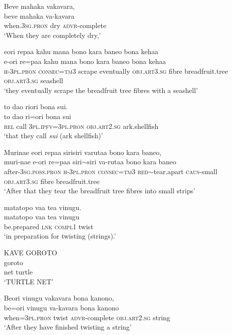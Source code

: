 \ea\label{ex:text4-19}
Beve mahaka vakavara,\\
\gll beve	mahaka	va-kavara\\
     when.3\textsc{sg}.\textsc{pron}	dry	\textsc{advr}-complete\\
\glt `When they are completely dry,'
\z

\newpage
\ea\label{ex:text4-20}
eori repaa kahu mana bono kara baneo bona kehaa\\
\gll e-ori	re=paa	kahu	mana	bono	kara	baneo	bona	kehaa\\
     \textsc{h}-3\textsc{pl}.\textsc{pron}	\textsc{consec}=\textsc{tm}3	scrape	eventually	\textsc{obj}.\textsc{art}3.\textsc{sg}	fibre	breadfruit.tree	\textsc{obj}.\textsc{art}3.\textsc{sg}	seashell\\
\glt `they eventually scrape the breadfruit tree fibres with a seashell'
\z

\ea\label{ex:text4-21}
to dao riori bona sui.\\
\gll to	dao	ri=ori	bona	sui\\
     \textsc{rel}	call	3\textsc{pl}.\textsc{ipfv}=3\textsc{pl}.\textsc{pron}	\textsc{obj}.\textsc{art}2.\textsc{sg}	ark.shellfish\\
\glt `that they call \textit{sui} (ark shellfish)'
\z

\ea\label{ex:text4-22}
Murinae eori repaa sirisiri varutaa bono kara baneo,\\
\gll muri-nae	e-ori	re=paa	siri{$\sim$}siri	va-rutaa	bono	kara	baneo\\
     after-3\textsc{sg}.\textsc{poss}.\textsc{pron}	\textsc{h}-3\textsc{pl}.\textsc{pron}	\textsc{consec}=\textsc{tm}3	\textsc{red}{$\sim$}tear.apart	\textsc{caus}-small	\textsc{obj}.\textsc{art}3.\textsc{sg}	fibre	breadfruit.tree\\
\glt `After that they tear the breadfruit tree fibres into small strips'
\z

\ea\label{ex:text4-23}
matatopo vaa tea vinugu.\\
\gll matatopo	vaa	tea	vinugu\\
     be.prepared	\textsc{lnk}	\textsc{compl}1	twist\\
\glt `in preparation for twisting (strings).'
\z

\ea\label{ex:text4-24}
KAVE GOROTO\\
	goroto\\
     net	turtle\\
\glt `TURTLE NET'
\z

\ea\label{ex:text4-25}
Beori vinugu vakavara bona kanono,\\
\gll be=ori	vinugu	va-kavara	bona	kanono\\
     when=3\textsc{pl}.\textsc{pron}	twist	\textsc{advr}-complete	\textsc{obj}.\textsc{art}2.\textsc{sg}	string\\
\glt `After they have finished twisting a string'
\z

